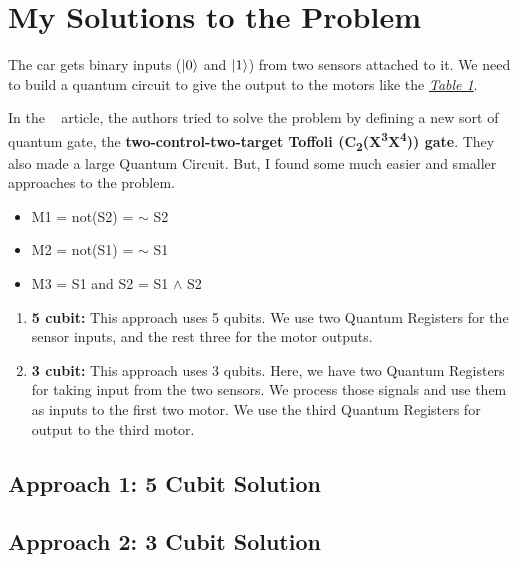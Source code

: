 \section{My Solutions to the Problem}

	The car gets binary inputs ($\ket{0}$ and $\ket{1}$) from two sensors attached to it. We need to build a quantum circuit to give the output to the motors like the \hyperref[table:1]{\textit{Table 1}}.
	
	In the ~\cite{mahanti2019quantum} article, the authors tried to solve the problem by defining a new sort of quantum gate, the \textbf{two-control-two-target Toffoli (C\textsubscript{2}(X\textsuperscript{3}X\textsuperscript{4})) gate}. They also made a large Quantum Circuit. But, I found some much easier and smaller approaches to the problem.	
	\vspace{3mm}

	
	\begin{itemize}
		\item M1 = not(S2) = $\sim$ S2
		\item M2 = not(S1) = $\sim$ S1
		\item M3 = S1 and S2 = S1 $\land$ S2
	\end{itemize}
	\begin{enumerate}
		\item \textbf{5 cubit:} This approach uses 5 qubits. We use two Quantum Registers for the sensor inputs, and the rest three for the motor outputs.
		\item \textbf{3 cubit:} This approach uses 3 qubits. Here, we have two Quantum Registers for taking input from the two sensors. We process those signals and use them as inputs to the first two motor. We use the third Quantum Registers for output to the third motor.
	\end{enumerate}

	\subsection{Approach 1: 5 Cubit Solution}
	\label{solution:1}
		

	\subsection{Approach 2: 3 Cubit Solution}
	\label{solution:2}
		